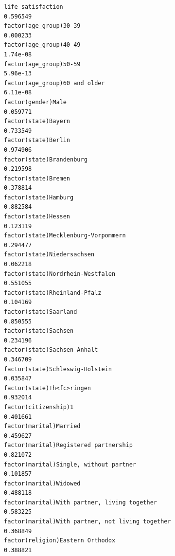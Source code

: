 \documentclass[
]{article}
\begin{document}
\begin{table}
\begin{minipage}[t]{\linewidth}
{\begin{verbatim}
life_satisfaction                                                                 0.596549
factor(age_group)30-39                                                            0.000233
factor(age_group)40-49                                                            1.74e-08
factor(age_group)50-59                                                            5.96e-13
factor(age_group)60 and older                                                     6.11e-08
factor(gender)Male                                                                0.059771
factor(state)Bayern                                                               0.733549
factor(state)Berlin                                                               0.974906
factor(state)Brandenburg                                                          0.219598
factor(state)Bremen                                                               0.378814
factor(state)Hamburg                                                              0.882584
factor(state)Hessen                                                               0.123119
factor(state)Mecklenburg-Vorpommern                                               0.294477
factor(state)Niedersachsen                                                        0.062218
factor(state)Nordrhein-Westfalen                                                  0.551055
factor(state)Rheinland-Pfalz                                                      0.104169
factor(state)Saarland                                                             0.850555
factor(state)Sachsen                                                              0.234196
factor(state)Sachsen-Anhalt                                                       0.346709
factor(state)Schleswig-Holstein                                                   0.035847
factor(state)Th<fc>ringen                                                         0.932014
factor(citizenship)1                                                              0.401661
factor(marital)Married                                                            0.459627
factor(marital)Registered partnership                                             0.821072
factor(marital)Single, without partner                                            0.101857
factor(marital)Widowed                                                            0.488118
factor(marital)With partner, living together                                      0.583225
factor(marital)With partner, not living together                                  0.368849
factor(religion)Eastern Orthodox                                                  0.388821

\end{verbatim}}
\end{minipage}
\end{table}
\end{document}
